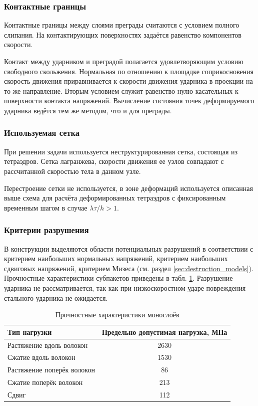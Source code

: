 \subsubsection*{Контактные границы}

Контактные границы между слоями преграды считаются с условием полного слипания. На контактирующих поверхностях задаётся равенство компонентов скорости.

Контакт между ударником и преградой полагается удовлетворяющим условию свободного скольжения. Нормальная по отношению к площадке соприкосновения скорость движения приравнивается к скорости движения ударника в проекции на то же направление. Вторым условием служит равенство нулю касательных к поверхности контакта напряжений. Вычисление состояния точек деформируемого ударника ведётся тем же методом, что и для преграды.

\subsubsection*{Используемая сетка}

При решении задачи используется неструктурированная сетка, состоящая из тетраэдров. Сетка лагранжева, скорости движения ее узлов совпадают с рассчитанной скоростью тела в данном узле.

Перестроение сетки не используется, в зоне деформаций используется описанная выше схема для расчёта деформированных тетраэдров с фиксированным временным шагом в случае $\lambda \tau / h > 1$.

\subsubsection*{Критерии разрушения}

В конструкции выделяются области потенциальных разрушений в соответствии с критерием наибольших нормальных напряжений, критерием наибольших сдвиговых напряжений, критерием Мизеса (см. раздел \ref{sec:destruction_models}). Прочностные характеристики субпакетов приведены в табл. \ref{tbl:max_stresses}. Разрушение ударника не рассматривается, так как при низкоскоростном ударе повреждения стального ударника не ожидается.

\begin{table}[h]
\centering
\caption{Прочностные характеристики монослоёв}
\begin{tabular}{|l|c|}
\hline
Тип нагрузки & Предельно допустимая нагрузка, МПа \\
\hline
Растяжение вдоль волокон & 2630 \\
Сжатие вдоль волокон & 1530 \\
Растяжение поперёк волокон & 86 \\
Сжатие поперёк волокон & 213 \\
Сдвиг & 112 \\
\hline
\end{tabular}
\label{tbl:max_stresses}
\end{table}

